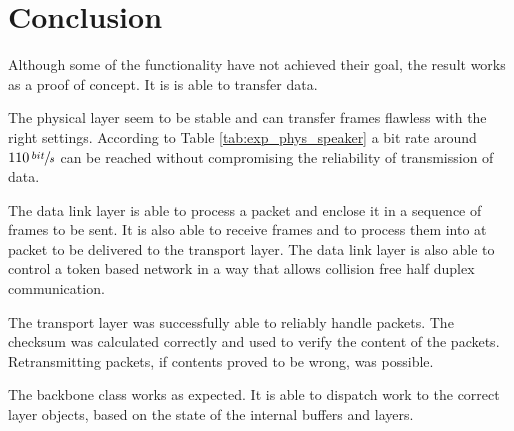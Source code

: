 \chapter{Conclusion}\label{chap:conclusion}
Although some of the functionality have not achieved their goal, the result works as a proof of concept. It is is able to transfer data.

The physical layer seem to be stable and can transfer frames flawless with the right settings. According to Table \ref{tab:exp_phys_speaker} a bit rate around $110\,\sfrac{bit}{s}$ can be reached without compromising the reliability of transmission of data. 

The data link layer is able to process a packet and enclose it in a sequence of frames to be sent. It is also able to receive frames and to process them into at packet to be delivered to the transport layer. The data link layer is also able to control a token based network in a way that allows collision free half duplex communication. 


The transport layer was successfully able to reliably handle packets. The checksum was calculated correctly and used to verify the content of the packets. Retransmitting packets, if contents proved to be wrong, was possible. %

The backbone class works as expected. It is able to dispatch work to the correct layer objects, based on the state of the internal buffers and layers.

